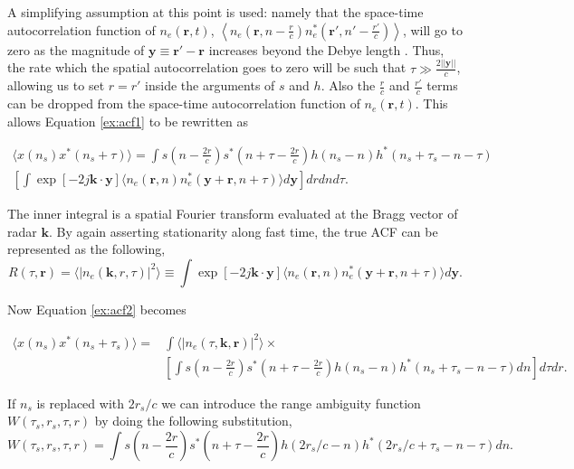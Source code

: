 \noindent A simplifying assumption at this point is used: namely that the space-time autocorrelation function of $n_e(\mathbf{r},t)$, $\left\langle n_e\left(\mathbf{r},n-\frac{r}{c}\right)n^*_e\left(\mathbf{r}',n'-\frac{r'}{c}\right)\right\rangle$, will go to zero as the magnitude of $\mathbf{y} \equiv \mathbf{r}'-\mathbf{r}$ increases beyond the Debye length \citep{farley1969}. Thus, the rate which the spatial autocorrelation goes to zero will be such that $\tau\gg \frac{2||\mathbf{y}||}{c}$, allowing us to set $r= r'$ inside the arguments of $s$ and $h$. Also the $\frac{r}{c}$ and $\frac{r'}{c}$ terms can be dropped from the space-time autocorrelation function of $n_e(\mathbf{r},t)$. This allows Equation \ref{ex:acf1} to be rewritten as 
 
 \begin{multline}
 \label{ex:acf2}
 \langle x(n_s)x^*(n_s+\tau)\rangle = \int s\left(n-\frac{2r}{c}\right)s^*\left(n+\tau -\frac{2r}{c}\right) h(n_s-n)h^*(n_s+\tau_s-n-\tau) \\\left[\int \exp\left[-2j \mathbf{k}\cdot \mathbf{y}\right] \langle n_e(\mathbf{r},n)n^*_e(\mathbf{y}+\mathbf{r},n+\tau)\rangle d\mathbf{y} \right]drdn d\tau.
 \end{multline}

The inner integral is a spatial Fourier transform evaluated at the Bragg vector of radar $\mathbf{k}$. By again asserting stationarity along fast time, the true ACF can be represented as the following,
 \begin{equation}
 \label{eq:spft}
R(\tau,\mathbf{r})= \langle |n_e(\mathbf{k},r,\tau)|^2\rangle \equiv  \int \exp\left[-2j \mathbf{k}\cdot \mathbf{y} \right] \langle n_e(\mathbf{r},n)n^*_e(\mathbf{y}+\mathbf{r},n+\tau)\rangle d\mathbf{y}.
 \end{equation}
 
 \noindent Now Equation \ref{ex:acf2} becomes
 
 \begin{equation}
 \label{eqn:inbetween}
 \begin{split}
 \langle x(n_s)x^*(n_s+\tau_s)\rangle =& \int \langle |n_e(\tau,\mathbf{k},\mathbf{r})|^2\rangle \times\\ &\left[\int s(n-\frac{2r}{c})s^*(n+\tau -\frac{2r}{c})h(n_s-n)h^*(n_s+\tau_s-n-\tau) dn \right]d\tau dr.
 \end{split}
 \end{equation}

 If $n_s$ is replaced with $2r_s/c$ we can introduce the range ambiguity function $W(\tau_s,r_s,\tau,r)$ by doing the following substitution,
 \begin{equation}
 \label{eqn:rngamb}
 W(\tau_s,r_s,\tau,r)= \int s(n-\frac{2r}{c})s^*(n+\tau -\frac{2r}{c})h(2r_s/c-n)h^*(2r_s/c+\tau_s-n-\tau) dn.
 \end{equation}
 
